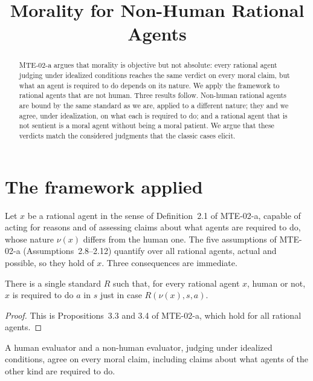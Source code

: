 \documentclass{situationist-preprint}
\title{Morality for Non-Human Rational Agents}
\begin{document}
\maketitle

\begin{abstract}
MTE-02-a argues that morality is objective but not absolute: every rational agent judging under idealized conditions reaches the same verdict on every moral claim, but what an agent is required to do depends on its nature. We apply the framework to rational agents that are not human. Three results follow. Non-human rational agents are bound by the same standard as we are, applied to a different nature; they and we agree, under idealization, on what each is required to do; and a rational agent that is not sentient is a moral agent without being a moral patient. We argue that these verdicts match the considered judgments that the classic cases elicit.
\end{abstract}

\section{The framework applied}\label{s:app}

Let $x$ be a rational agent in the sense of Definition~2.1 of MTE-02-a, capable of acting for reasons and of assessing claims about what agents are required to do, whose nature $\nu(x)$ differs from the human one. The five assumptions of MTE-02-a (Assumptions~2.8--2.12) quantify over all rational agents, actual and possible, so they hold of $x$. Three consequences are immediate.

\begin{proposition}\label{p:one}
There is a single standard $R$ such that, for every rational agent $x$, human or not, $x$ is required to do $a$ in $s$ just in case $R(\nu(x),s,a)$.
\end{proposition}

\begin{proof}
This is Propositions~3.3 and 3.4 of MTE-02-a, which hold for all rational agents.
\end{proof}

\begin{proposition}\label{p:agree}
A human evaluator and a non-human evaluator, judging under idealized conditions, agree on every moral claim, including claims about what agents of the other kind are required to do.
\end{proposition}
\end{document}
